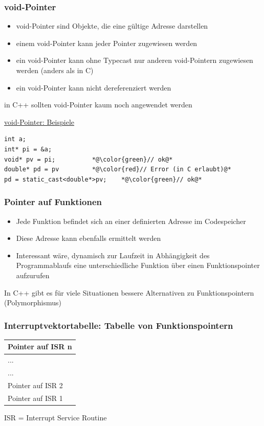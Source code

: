 \subsubsection{void-Pointer}
\label{sec:void-Pointer}
\begin{itemize}
	\item void-Pointer sind Objekte, die eine gültige Adresse darstellen
	\item einem void-Pointer kann jeder Pointer zugewiesen werden
	\item \Large{ein void-Pointer kann ohne Typecast nur anderen void-Pointern zugewiesen werden (anders als in C)}\normalsize
	\item ein void-Pointer kann nicht dereferenziert werden
\end{itemize}
\begin{hinweis}
in C++ sollten void-Pointer kaum noch angewendet werden
\end{hinweis}
\underline{void-Pointer: Beispiele}\\
\noindent
\begin{minipage}{\linewidth}
\begin{lstlisting}
int a;
int* pi = &a;
void* pv = pi;			*@\color{green}// ok@*
double* pd = pv			*@\color{red}// Error (in C erlaubt)@*
pd = static_cast<double*>pv;	*@\color{green}// ok@*
\end{lstlisting}
\end{minipage}

\subsubsection{Pointer auf Funktionen}
\label{sec:Pointer auf Funktionen}
\begin{itemize}
	\item Jede Funktion befindet sich an einer definierten Adresse im Codespeicher
	\item Diese Adresse kann ebenfalls ermittelt werden
	\item Interessant wäre, dynamisch zur Laufzeit in Abhängigkeit des Programmablaufs eine unterschiedliche Funktion über einen Funktionspointer aufzurufen
\end{itemize}
\begin{hinweis}
In C++ gibt es für viele Situationen bessere Alternativen zu Funktionspointern (Polymorphismus)
\end{hinweis}

\subsubsection{Interruptvektortabelle: Tabelle von Funktionspointern}
\label{sec:Interruptvektortabelle: Tabelle von Funktionspointern}
\centering
\begin{tabularx}{0.25\textwidth}{|X|}
	\hline
	Pointer auf ISR n\\
	\hline
	...\\
	\hline
	...\\
	\hline
	Pointer auf ISR 2\\
	\hline
	Pointer auf ISR 1\\
	\hline
\end{tabularx}
\flushleft
ISR = Interrupt Service Routine

